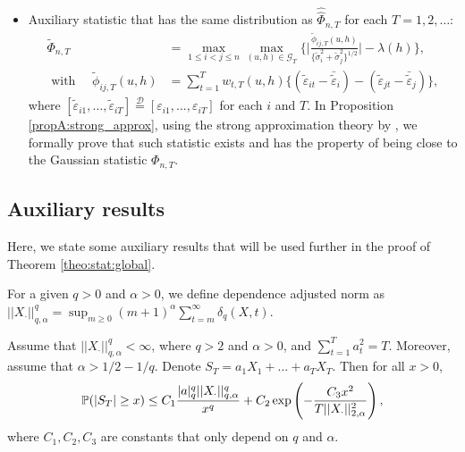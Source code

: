 \documentclass[a4paper,12pt]{article}
\newcommand{\doublehattwo}[1]{\widehat{\widehat{#1}}}
\begin{document}
\begin{itemize}
\item Auxiliary statistic that has the same distribution as $\doublehattwo{\Phi}_{n, T}$ for each $T = 1, 2, \ldots$: 
\begin{align*}
\widetilde{\Phi}_{n,T} &= \max_{1 \le i < j \le n}  \max_{(u,h) \in \mathcal{G}_T} \Bigg\{ \bigg|\frac{\widetilde{\phi}_{ij, T}(u,h)}{\{\widetilde{\sigma}_i^2 + \widetilde{\sigma}_j^2 \}^{1/2}} \bigg| - \lambda(h)\Bigg\}, \\
   \text{ with  } \quad  \widetilde{\phi}_{ij, T}(u,h) &= \sum\nolimits_{t=1}^T w_{t,T}(u,h) \big\{ (\widetilde{\varepsilon}_{it} - \bar{\widetilde{\varepsilon}}_i)  - (\widetilde{\varepsilon}_{jt} - \bar{\widetilde{\varepsilon}}_j)\big\},
  \end{align*}
where $[\widetilde{\varepsilon}_{i1},\ldots,\widetilde{\varepsilon}_{iT}] \stackrel{\mathcal{D}}{=} [\varepsilon_{i1},\ldots,\varepsilon_{iT}]$ for each $i$ and $T$. In Proposition \ref{propA:strong_approx}, using the strong approximation theory by \cite{BerkesLiuWu2014}, we formally prove that such statistic exists and has the property of being close to the Gaussian statistic $\Phi_{n,T}$.

\end{itemize}

\subsection{Auxiliary results}\label{subsec:appendix:aux}

Here, we state some auxiliary results that will be used further in the proof of Theorem \ref{theo:stat:global}.

\begin{definitionA}\label{defA-DAN} For a given $q > 0$ and $\alpha > 0$, we define dependence adjusted norm as 
$||X_{\cdot}||^{q}_{q, \alpha} = \sup_{m\geq 0} (m+1)^{\alpha} \sum_{t=m}^{\infty} \delta_{q}(X, t)$.
\end{definitionA}

\begin{theoremA}{\cite{Wu2016}}\label{theo-wu}
Assume that $||X_{\cdot}||^{q}_{q, \alpha} < \infty$, where $q > 2$ and $\alpha >0$, and $\sum_{t=1}^T a_t^2 = T.$ Moreover, assume that $\alpha > 1/2 - 1/q$. Denote $S_T = a_1 X_1 + \ldots + a_T X_T$. Then for all $x>0$,
\begin{align*}
	\mathbb{P}(|S_T| \geq x) \leq C_1 \frac{|a|_{q}^{q}||X_{\cdot}||^{q}_{q, \alpha}  }{x^{q}} + C_2 \exp \left( - \frac{C_3 x^2} {T ||X_\cdot||^2_{2, \alpha}}\right),
\end{align*}
where $C_1, C_2, C_3$ are constants that only depend on $q$ and $\alpha$.
\end{theoremA}
\end{document}
